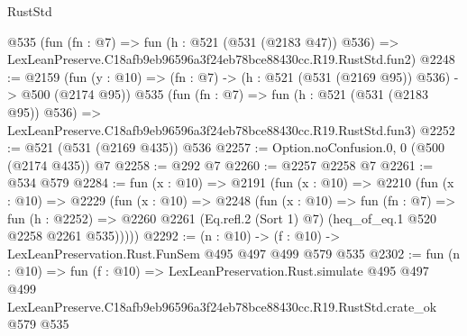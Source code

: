 \begin{lexlean}{RustStd}
\begin{coremodule}
    @535
    (fun (fn : @7) =>
    fun (h : @521 (@531 (@2183 @47)) @536) =>
    LexLeanPreserve.C18afb9eb96596a3f24eb78bce88430cc.R19.RustStd.fun2)
@2248 := @2159
    (fun (y : @10) => (fn : @7) -> (h : @521 (@531 (@2169 @95)) @536) -> @500 (@2174 @95))
    @535
    (fun (fn : @7) =>
    fun (h : @521 (@531 (@2183 @95)) @536) =>
    LexLeanPreserve.C18afb9eb96596a3f24eb78bce88430cc.R19.RustStd.fun3)
@2252 := @521 (@531 (@2169 @435)) @536
@2257 := Option.noConfusion.{0, 0} (@500 (@2174 @435)) @7
@2258 := @292 @7
@2260 := @2257 @2258 @7
@2261 := @534 @579
@2284 := fun (x : @10) =>
  @2191
    (fun (x : @10) =>
    @2210
      (fun (x : @10) =>
      @2229
        (fun (x : @10) =>
        @2248
          (fun (x : @10) =>
          fun (fn : @7) =>
          fun (h : @2252) =>
          @2260 @2261 (Eq.refl.{2} (Sort 1) @7) (heq_of_eq.{1} @520 @2258 @2261 @535)))))
@2292 := (n : @10) -> (f : @10) -> LexLeanPreservation.Rust.FunSem @495 @497 @499 @579 @535
@2302 := fun (n : @10) =>
  fun (f : @10) =>
  LexLeanPreservation.Rust.simulate
    @495
    @497
    @499
    LexLeanPreserve.C18afb9eb96596a3f24eb78bce88430cc.R19.RustStd.crate_ok
    @579
    @535
\end{coremodule}
\end{lexlean}
